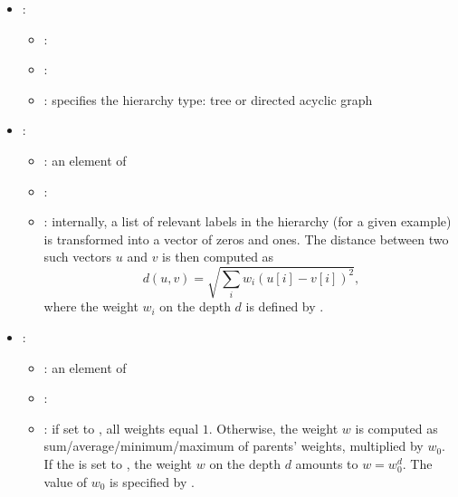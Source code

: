 \begin{itemize}
    \item {}:
           \begin{itemize}
                \item \optionPossibleValues{}: 
                \item \optionDefaultValue{}: 
                \item \optionDescrption{}: specifies the hierarchy type: tree or directed acyclic graph \cite{Vens08:jrnl}
           \end{itemize}
    \item {}:
           \begin{itemize}
                \item \optionPossibleValues{}: an element of    
                \item \optionDefaultValue{}: 
                \item \optionDescrption{}: internally, a list of relevant labels in the hierarchy (for a given example) is transformed into a vector of zeros and ones. The distance between
                two such vectors $u$ and $v$ is then computed as
                $$
                d(u, v) = \sqrt{\sum_i w_i (u[i] - v[i])^2}\text{,}
                $$
                where the weight $w_i$ on the depth $d$ is defined by .
           \end{itemize}
    \item {}:
           \begin{itemize}
                \item \optionPossibleValues{}: an element of 
                \item \optionDefaultValue{}: 
                \item \optionDescrption{}: if set to , all weights equal $1$. Otherwise,
                the weight $w$ is computed as sum/average/minimum/maximum of parents' weights, multiplied by $w_0$.
                If the  is set to , the
                weight $w$ on the depth $d$ amounts to $w = w_0^d$. The value of $w_0$ is specified by .
                

\end{itemize}
\end{itemize}
